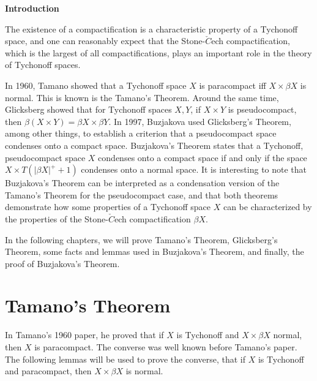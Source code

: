 \documentclass{article}
\begin{document}
\tableofcontents
\newpage
\begin{center}
\textbf{Introduction}
\end{center}
\vskip 30pt
The existence of a compactification is a characteristic property of a Tychonoff space, and one can reasonably expect that the Stone-$\check{C}$ech compactification, which is the largest of all compactifications, plays an important role in the theory of Tychonoff spaces. 

\vskip 15pt
In 1960, Tamano showed that a Tychonoff space $X$ is paracompact iff $X\times \beta X$ is normal. This is known is the Tamano's Theorem. Around the same time, Glicksberg showed that for Tychonoff spaces $X,Y$, if $X\times Y$ is pseudocompact, then $\beta (X\times Y)=\beta X\times \beta Y$. In 1997, Buzjakova used Glicksberg's Theorem, among other things, to establish a criterion that a pseudocompact space condenses onto a compact space. 
Buzjakova's Theorem states that a Tychonoff, pseudocompact space $X$ condenses onto a compact space if and only if the space $X\times T(|\beta X|^+ +1)$ condenses onto a normal space.
\vskip 15pt
It is interesting to note that Buzjakova's Theorem can be interpreted as a condensation version of the Tamano's Theorem for the pseudocompact case, and that both theorems demonstrate how some properties of a Tychonoff space $X$ can be characterized by the properties of the Stone-$\check{C}$ech compactification $\beta X$.

\vskip 15pt
In the following chapters, we will prove Tamano's Theorem, Glicksberg's Theorem, some facts and lemmas used in Buzjakova's Theorem, and finally, the proof of Buzjakova's Theorem. 






\newpage





\section{Tamano's Theorem}



\vskip 20pt

In Tamano's 1960 paper, he proved that if $X$ is Tychonoff and $X\times \beta X$ normal, then $X$ is paracompact. The converse was well known before Tamano's paper. The following lemmas will be used to prove the converse, that if $X$ is Tychonoff and paracompact, then $X\times \beta X$ is normal.
\end{document}
